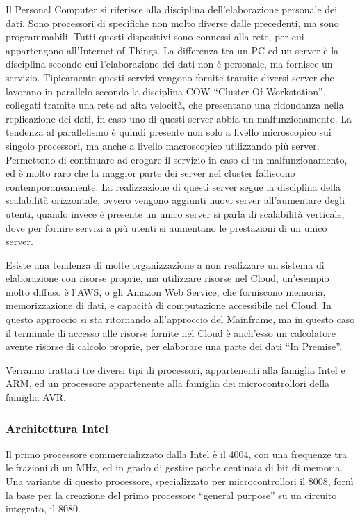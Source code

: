 \documentclass{article}
\numberwithin{equation}{subsection}
\begin{document}
Il Personal Computer si riferisce alla disciplina dell'elaborazione personale dei dati. Sono processori di specifiche non molto diverse dalle precedenti, ma sono 
programmabili. Tutti questi dispositivi sono connessi alla rete, per cui appartengono all'Internet of Things. La differenza tra un PC ed un server è la disciplina secondo cui 
l'elaborazione dei dati non è personale, ma fornisce un servizio. Tipicamente questi servizi vengono fornite tramite diversi server che lavorano in parallelo secondo la 
disciplina COW ``Cluster Of Workstation'', collegati 
tramite una rete ad alta velocità, che presentano una ridondanza nella replicazione dei dati, in caso uno di questi server abbia un malfunzionamento. La tendenza al parallelismo 
è quindi presente non solo a livello microscopico sui singolo processori, ma anche a livello macroscopico utilizzando più server. Permettono di continuare ad erogare il servizio in 
caso di un malfunzionamento, ed è molto raro che la maggior parte dei server nel cluster falliscono contemporaneamente. La realizzazione di questi server segue la disciplina 
della scalabilità orizzontale, ovvero vengono aggiunti nuovi server all'aumentare degli utenti, quando invece è presente un unico server si parla di scalabilità verticale, dove 
per fornire servizi a più utenti si aumentano le prestazioni di un unico server. 


Esiste una tendenza di molte organizzazione a non realizzare un sistema di elaborazione con risorse proprie, ma utilizzare risorse nel Cloud, un'esempio molto diffuso è l'AWS, 
o gli Amazon Web Service, che forniscono memoria, memorizzazione di dati, e capacità di computazione accessibile nel Cloud. In questo approccio si sta ritornando all'approccio 
del Mainframe, ma in questo caso il terminale di accesso alle risorse fornite nel Cloud è anch'esso un calcolatore avente risorse di calcolo proprie, per elaborare una 
parte dei dati ``In Premise''. 



Verranno trattati tre diversi tipi di processori, appartenenti alla famiglia Intel e ARM, ed un processore appartenente alla famiglia dei microcontrollori della famiglia AVR.
\subsubsection{Architettura Intel}

Il primo processore commercializzato dalla Intel è il 4004, con una frequenze tra le frazioni di un MHz, ed in grado di gestire poche centinaia di bit di memoria. Una variante 
di questo processore, specializzato per microcontrollori il 8008, fornì la base per la creazione del primo processore ``general purpose'' su un circuito integrato, il 8080.  
\end{document}
